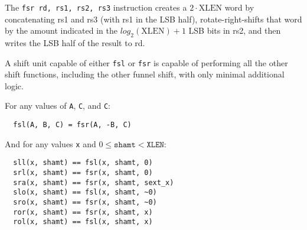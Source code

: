The {\tt fsr rd, rs1, rs2, rs3} instruction creates a $2\cdot\textrm{XLEN}$ word
by concatenating rs1 and rs3 (with rs1 in the LSB half), rotate-right-shifts that
word by the amount indicated in the $log_2(\textrm{XLEN})+1$ LSB bits in rs2, and
then writes the LSB half of the result to rd.





A shift unit capable of either {\tt fsl} or {\tt fsr} is capable of performing all
the other shift functions, including the other funnel shift, with only minimal additional
logic.

For any values of {\tt A}, {\tt C}, and {\tt C}:

\begin{verbatim}
  fsl(A, B, C) = fsr(A, -B, C)
\end{verbatim}

And for any values {\tt x} and $0 \le \texttt{shamt} < \texttt{XLEN}$:

\begin{verbatim}
  sll(x, shamt) == fsl(x, shamt, 0)
  srl(x, shamt) == fsr(x, shamt, 0)
  sra(x, shamt) == fsr(x, shamt, sext_x)
  slo(x, shamt) == fsl(x, shamt, ~0)
  sro(x, shamt) == fsr(x, shamt, ~0)
  ror(x, shamt) == fsr(x, shamt, x)
  rol(x, shamt) == fsl(x, shamt, x)
\end{verbatim}
